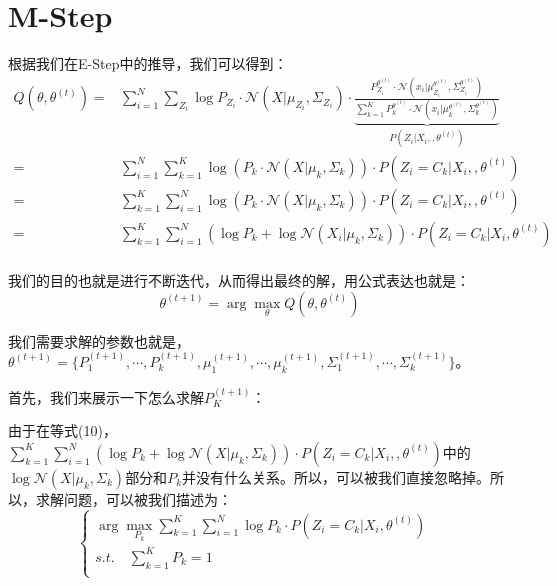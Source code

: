 \documentclass[a4paper]{article}
\begin{document}
\section{M-Step}
根据我们在E-Step中的推导，我们可以得到：
\begin{equation}
    \begin{split}
        Q(\theta,\theta^{(t)})  
        = & \sum_{i=1}^N \sum_{Z_i} \log P_{Z_i}\cdot \mathcal{N}(X|\mu_{Z_i},\Sigma_{Z_i}) \cdot \underbrace{\frac{P_{Z_i}^{\theta^{(t)}}\cdot \mathcal{N}(x_i|\mu_{Z_i}^{\theta^{(t)}},\Sigma_{Z_i}^{\theta^{(t)}})}{\sum_{k=1}^K P_k^{\theta^{(t)}}\cdot \mathcal{N}(x_i|\mu_k^{\theta^{(t)}},\Sigma_k^{\theta^{(t)}})}}_{P(Z_i|X_i,,\theta^{(t)})} \\
        = & \sum_{i=1}^N \sum_{k=1}^K \log \left( P_{k}\cdot \mathcal{N}(X|\mu_{k},\Sigma_{k}) \right) \cdot P(Z_i=C_k|X_i,,\theta^{(t)}) \\
        = & \sum_{k=1}^K \sum_{i=1}^N \log \left( P_{k}\cdot \mathcal{N}(X|\mu_{k},\Sigma_{k}) \right) \cdot P(Z_i = C_k|X_i,,\theta^{(t)}) \\
        = & \sum_{k=1}^K \sum_{i=1}^N \left( \log P_{k} + \log  \mathcal{N}(X_i|\mu_{k},\Sigma_{k}) \right) \cdot P(Z_i = C_k|X_i,\theta^{(t)}) \\
    \end{split}
\end{equation}

我们的目的也就是进行不断迭代，从而得出最终的解，用公式表达也就是：
\begin{equation}
    \theta^{(t+1)} = \arg\max_{\theta} Q(\theta,\theta^{(t)})
\end{equation}

我们需要求解的参数也就是，$\theta^{(t+1)}=\{ P_1^{(t+1)}, \cdots, P_k^{(t+1)}, \mu_1^{(t+1)}, \cdots, \mu_k^{(t+1)},\Sigma_1^{(t+1)},\cdots,\Sigma_k^{(t+1)} \}$。

首先，我们来展示一下怎么求解$P_K^{(t+1)}$：

由于在等式(10)，$\sum_{k=1}^K \sum_{i=1}^N \left( \log P_{k} + \log  \mathcal{N}(X|\mu_{k},\Sigma_{k}) \right) \cdot P(Z_i = C_k|X_i,,\theta^{(t)})$中的$\log  \mathcal{N}(X|\mu_{k},\Sigma_{k})$部分和$P_k$并没有什么关系。所以，可以被我们直接忽略掉。所以，求解问题，可以被我们描述为：
\begin{equation}
    \left\{
        \begin{array}{ll}
            \arg\max_{P_k} \sum_{k=1}^K \sum_{i=1}^N  \log P_{k} \cdot P(Z_i = C_k|X_i,\theta^{(t)}) & \\
            s.t. \quad \sum_{k=1}^K P_k = 1 & \\
        \end{array}
    \right.
\end{equation}
\end{document}
